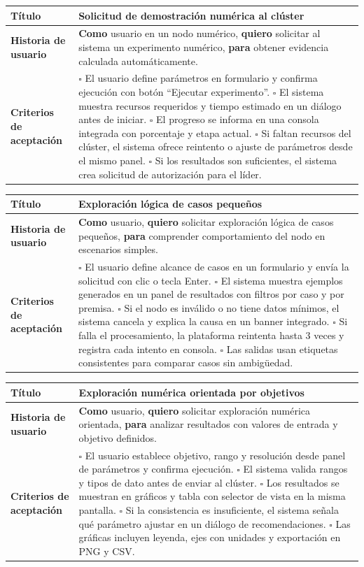 \documentclass{article}
\newcommand{\story}[3]{
\begin{table}[H]
    \centering
    \begin{tabularx}{\textwidth}{| >{\raggedright\arraybackslash\bfseries\columncolor{leftheaderbg}}p{2.5cm} | >{\raggedright\arraybackslash\columncolor{contentbg}}X |}
        \hline
        Título & #1 \\
        \hline
        Historia de usuario & #2 \\
        \hline
        Criterios de aceptación & #3 \\
        \hline
    \end{tabularx}
\end{table}
}
\begin{document}
\story
{Solicitud de demostración numérica al clúster}
{\textbf{Como} usuario en un nodo numérico, \textbf{quiero} solicitar al sistema un experimento numérico, \textbf{para} obtener evidencia calculada automáticamente.}
{$\square$ El usuario define parámetros en formulario y confirma ejecución con botón ``Ejecutar experimento''. \newline
$\square$ El sistema muestra recursos requeridos y tiempo estimado en un diálogo antes de iniciar. \newline
$\square$ El progreso se informa en una consola integrada con porcentaje y etapa actual. \newline
$\square$ Si faltan recursos del clúster, el sistema ofrece reintento o ajuste de parámetros desde el mismo panel. \newline
$\square$ Si los resultados son suficientes, el sistema crea solicitud de autorización para el líder.}

\story
{Exploración lógica de casos pequeños}
{\textbf{Como} usuario, \textbf{quiero} solicitar exploración lógica de casos pequeños, \textbf{para} comprender comportamiento del nodo en escenarios simples.}
{$\square$ El usuario define alcance de casos en un formulario y envía la solicitud con clic o tecla Enter. \newline
$\square$ El sistema muestra ejemplos generados en un panel de resultados con filtros por caso y por premisa. \newline
$\square$ Si el nodo es inválido o no tiene datos mínimos, el sistema cancela y explica la causa en un banner integrado. \newline
$\square$ Si falla el procesamiento, la plataforma reintenta hasta 3 veces y registra cada intento en consola. \newline
$\square$ Las salidas usan etiquetas consistentes para comparar casos sin ambigüedad.}

\story
{Exploración numérica orientada por objetivos}
{\textbf{Como} usuario, \textbf{quiero} solicitar exploración numérica orientada, \textbf{para} analizar resultados con valores de entrada y objetivo definidos.}
{$\square$ El usuario establece objetivo, rango y resolución desde panel de parámetros y confirma ejecución. \newline
$\square$ El sistema valida rangos y tipos de dato antes de enviar al clúster. \newline
$\square$ Los resultados se muestran en gráficos y tabla con selector de vista en la misma pantalla. \newline
$\square$ Si la consistencia es insuficiente, el sistema señala qué parámetro ajustar en un diálogo de recomendaciones. \newline
$\square$ Las gráficas incluyen leyenda, ejes con unidades y exportación en PNG y CSV.}
\end{document}
